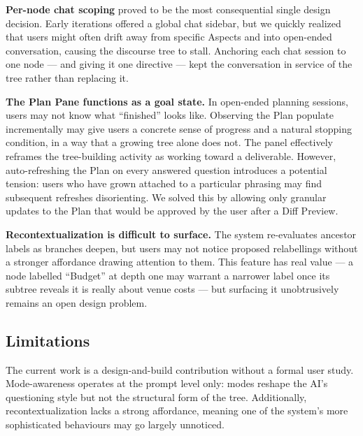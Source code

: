 \documentclass[sigconf]{acmart}
\begin{document}
\textbf{Per-node chat scoping} proved to be the most consequential single design
decision. Early iterations offered a global chat sidebar, but we quickly realized that users might often drift away from
specific Aspects and into open-ended conversation, causing the discourse tree to stall. Anchoring each chat session to one node --- and giving it one directive ---
kept the conversation in service of the tree rather than replacing it.

\textbf{The Plan Pane functions as a goal state.} In open-ended planning sessions,
users may not know what ``finished'' looks like. Observing the Plan populate
incrementally may give users a concrete sense of progress and a natural stopping
condition, in a way that a growing tree alone does not. The panel effectively reframes
the tree-building activity as working toward a deliverable. However, auto-refreshing the
Plan on every answered question introduces a potential tension: users who have grown
attached to a particular phrasing may find subsequent refreshes disorienting. We solved this by
allowing only granular updates to the Plan that would be approved by the user after a Diff Preview.

\textbf{Recontextualization is difficult to surface.} The system re-evaluates ancestor
labels as branches deepen, but users may not notice proposed relabellings without a stronger affordance drawing
attention to them. This feature has real value --- a node
labelled ``Budget'' at depth one may warrant a narrower label once its subtree reveals
it is really about venue costs --- but surfacing it unobtrusively remains an open
design problem.

\subsection{Limitations}
The current work is a design-and-build contribution without a formal user study.
Mode-awareness operates at the prompt level only: modes reshape the AI's questioning
style but not the structural form of the tree. Additionally, recontextualization 
lacks a strong affordance, meaning one of the system's more sophisticated behaviours may go largely unnoticed.

\end{document}
